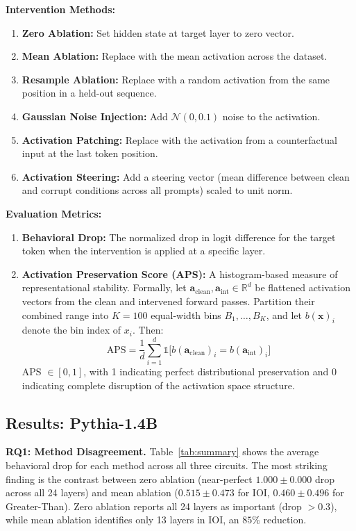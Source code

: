 \documentclass[pdflatex,sn-mathphys-num]{sn-jnl}
\begin{document}
\textbf{Intervention Methods:}
\begin{enumerate}
    \item \textbf{Zero Ablation:} Set hidden state at target layer to zero vector.
    \item \textbf{Mean Ablation:} Replace with the mean activation across the dataset.
    \item \textbf{Resample Ablation:} Replace with a random activation from the same position in a held-out sequence.
    \item \textbf{Gaussian Noise Injection:} Add $\mathcal{N}(0, 0.1)$ noise to the activation.
    \item \textbf{Activation Patching:} Replace with the activation from a counterfactual input at the last token position.
    \item \textbf{Activation Steering:} Add a steering vector (mean difference between clean and corrupt conditions across all prompts) scaled to unit norm.
\end{enumerate}

\textbf{Evaluation Metrics:}
\begin{enumerate}
    \item \textbf{Behavioral Drop:} The normalized drop in logit difference for the target token when the intervention is applied at a specific layer.
    \item \textbf{Activation Preservation Score (APS):} A histogram-based measure of representational stability. Formally, let $\mathbf{a}_{\text{clean}}, \mathbf{a}_{\text{int}} \in \mathbb{R}^d$ be flattened activation vectors from the clean and intervened forward passes. Partition their combined range into $K = 100$ equal-width bins $B_1, \ldots, B_K$, and let $b(\mathbf{x})_i$ denote the bin index of $x_i$. Then:
    \[
    \text{APS} = \frac{1}{d} \sum_{i=1}^{d} \mathbb{1}\bigl[b(\mathbf{a}_{\text{clean}})_i = b(\mathbf{a}_{\text{int}})_i\bigr]
    \]
    APS $\in [0, 1]$, with 1 indicating perfect distributional preservation and 0 indicating complete disruption of the activation space structure.
\end{enumerate}

\subsection{Results: Pythia-1.4B}

\textbf{RQ1: Method Disagreement.} Table~\ref{tab:summary} shows the average behavioral drop for each method across all three circuits. The most striking finding is the contrast between zero ablation (near-perfect $1.000 \pm 0.000$ drop across all 24 layers) and mean ablation ($0.515 \pm 0.473$ for IOI, $0.460 \pm 0.496$ for Greater-Than). Zero ablation reports all 24 layers as important (drop $>0.3$), while mean ablation identifies only 13 layers in IOI, an $85\%$ reduction.
\end{document}
